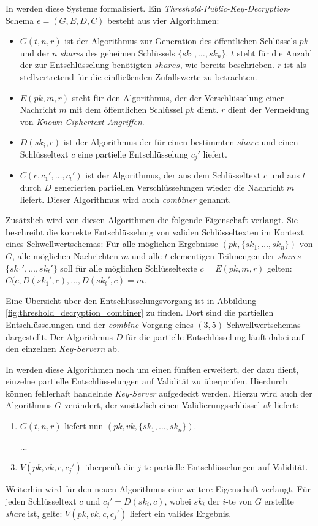 In \cite{boneh2016} werden diese Systeme formalisiert. Ein \textit{Threshold-Public-Key-Decryption}-Schema \(\epsilon = (G, E, D, C)\) besteht aus vier Algorithmen: 

\begin{itemize}
  \item \(G(t, n, r)\) ist der Algorithmus zur Generation des öffentlichen Schlüssels \(pk\) und der \(n\) \textit{shares} des geheimen Schlüssels \(\{sk_1, \dots, sk_n\}\). \(t\) steht für die Anzahl der zur Entschlüsselung benötigten \(shares\), wie bereits beschrieben. \(r\) ist als stellvertretend für die einfließenden Zufallswerte zu betrachten.
  
  \item \(E(pk, m, r)\) steht für den Algorithmus, der der Verschlüsselung einer Nachricht \(m\) mit dem öffentlichen Schlüssel \(pk\) dient. \(r\) dient der Vermeidung von \textit{Known-Ciphertext-Angriffen}. 
  
  \item \(D(sk_i, c)\) ist der Algorithmus der für einen bestimmten \(share\) und einen Schlüsseltext \(c\) eine partielle Entschlüsselung \(c_j'\) liefert.
  
  \item \(C(c, c_1', \dots, c_t')\) ist der Algorithmus, der aus dem Schlüsseltext \(c\) und aus \(t\) durch \(D\) generierten partiellen Verschlüsselungen wieder die Nachricht \(m\) liefert. Dieser Algorithmus wird auch \textit{combiner} genannt. 
\end{itemize}

Zusätzlich wird von diesen Algorithmen die folgende Eigenschaft verlangt. Sie beschreibt die korrekte Entschlüsselung von validen Schlüsseltexten im Kontext eines Schwellwertschemas: Für alle möglichen Ergebnisse \((pk, \{sk_1, \dots, sk_n\})\) von \(G\), alle möglichen Nachrichten \(m\) und alle \(t\)-elementigen Teilmengen der \textit{shares} \(\{sk_1', \dots, sk_t'\}\) soll für alle möglichen Schlüsseltexte \(c=E(pk, m, r)\) gelten: \(C(c, D(sk_1', c), \dots, D(sk_t', c) = m\).

Eine Übersicht über den Entschlüsselungsvorgang ist in Abbildung \ref{fig:threshold_decryption_combiner} zu finden. Dort sind die partiellen Entschlüsselungen und der \textit{combine}-Vorgang eines \((3,5)\)-Schwellwertschemas dargestellt. Der Algorithmus \(D\) für die partielle Entschlüsselung läuft dabei auf den einzelnen \textit{Key-Servern} ab.

In \cite{boneh2006} werden diese Algorithmen noch um einen fünften erweitert, der dazu dient, einzelne partielle Entschlüsselungen auf Validität zu überprüfen. Hierdurch können fehlerhaft handelnde \textit{Key-Server} aufgedeckt werden. Hierzu wird auch der Algorithmus \(G\) verändert, der zusätzlich einen Validierungsschlüssel \(vk\) liefert:
\begin{enumerate}
	\item \(G(t, n, r)\) liefert nun \((pk, vk, \{sk_1, \dots, sk_n\})\).
  \item[...] 
  \setcounter{enumi}{4}
	\item \(V(pk, vk, c, c_j')\) überprüft die \(j\)-te partielle Entschlüsselungen auf Validität.
\end{enumerate}

Weiterhin wird für den neuen Algorithmus eine weitere Eigenschaft verlangt. Für jeden Schlüsseltext \(c\) und \(c_j' = D(sk_i,c)\), wobei \(sk_i\) der \(i\)-te von \(G\) erstellte \textit{share} ist, gelte: \(V(pk, vk, c, c_j')\) liefert ein valides Ergebnis.